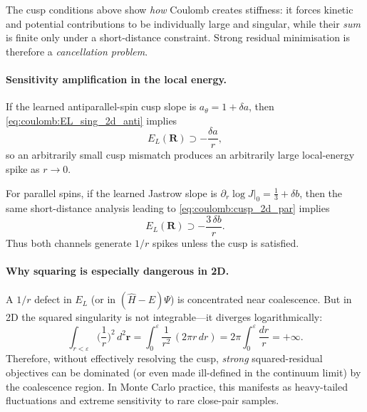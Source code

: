 The cusp conditions above show \emph{how} Coulomb creates stiffness: it forces
kinetic and potential contributions to be individually large and singular,
while their \emph{sum} is finite only under a short-distance constraint.
Strong residual minimisation is therefore a \emph{cancellation problem}.

\paragraph{Sensitivity amplification in the local energy.}
If the learned antiparallel-spin cusp slope is $a_\theta = 1+\delta a$, then
\eqref{eq:coulomb:EL_sing_2d_anti} implies
\begin{equation}
E_L(\mathbf R)\supset -\frac{\delta a}{r},
\label{eq:coulomb:EL_mismatch_2d_anti}
\end{equation}
so an arbitrarily small cusp mismatch produces an arbitrarily large local-energy spike
as $r\to 0$.

For parallel spins, if the learned Jastrow slope is
$\partial_r\log J|_{0}=\frac13+\delta b$, then the same short-distance analysis leading to
\eqref{eq:coulomb:cusp_2d_par} implies
\begin{equation}
E_L(\mathbf R)\supset -\frac{3\,\delta b}{r}.
\label{eq:coulomb:EL_mismatch_2d_par}
\end{equation}
Thus both channels generate $1/r$ spikes unless the cusp is satisfied.

\paragraph{Why squaring is especially dangerous in 2D.}
A $1/r$ defect in $E_L$ (or in $(\hat H-E)\Psi$) is concentrated near coalescence.
But in 2D the squared singularity is not integrable---it diverges logarithmically:
\[
\int_{r<\varepsilon}\Big(\frac{1}{r}\Big)^2\, d^2\mathbf r
=
\int_0^\varepsilon \frac{1}{r^2}\,(2\pi r\,dr)
=
2\pi\int_0^\varepsilon \frac{dr}{r}
=+\infty.
\]
Therefore, without effectively resolving the cusp, \emph{strong} squared-residual
objectives can be dominated (or even made ill-defined in the continuum limit) by the
coalescence region. In Monte Carlo practice, this manifests as heavy-tailed fluctuations
and extreme sensitivity to rare close-pair samples.

